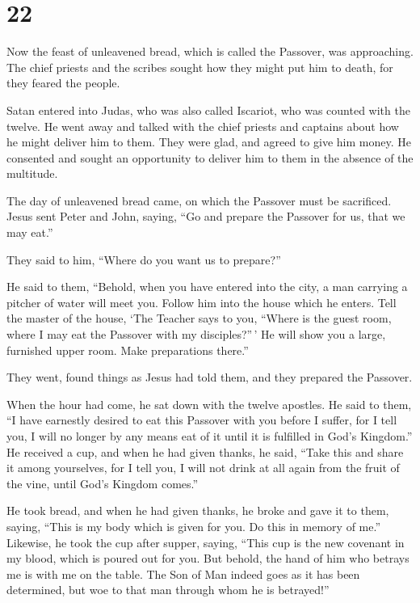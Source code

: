 \hypertarget{section-21}{%
\section{22}\label{section-21}}

 Now the feast of unleavened bread, which is called the
Passover, was approaching.  The chief priests and the
scribes sought how they might put him to death, for they feared the
people.

 Satan entered into Judas, who was also called Iscariot, who
was counted with the twelve.  He went away and talked with
the chief priests and captains about how he might deliver him to them.
 They were glad, and agreed to give him money. 
He consented and sought an opportunity to deliver him to them in the
absence of the multitude.

 The day of unleavened bread came, on which the Passover
must be sacrificed.  Jesus sent Peter and John, saying, ``Go
and prepare the Passover for us, that we may eat.''

 They said to him, ``Where do you want us to prepare?''

 He said to them, ``Behold, when you have entered into the
city, a man carrying a pitcher of water will meet you. Follow him into
the house which he enters.  Tell the master of the house,
`The Teacher says to you, ``Where is the guest room, where I may eat the
Passover with my disciples?''\,'  He will show you a large,
furnished upper room. Make preparations there.''

 They went, found things as Jesus had told them, and they
prepared the Passover.

 When the hour had come, he sat down with the twelve
apostles.  He said to them, ``I have earnestly desired to
eat this Passover with you before I suffer,  for I tell
you, I will no longer by any means eat of it until it is fulfilled in
God's Kingdom.''  He received a cup, and when he had given
thanks, he said, ``Take this and share it among yourselves,
 for I tell you, I will not drink at all again from the
fruit of the vine, until God's Kingdom comes.''

 He took bread, and when he had given thanks, he broke and
gave it to them, saying, ``This is my body which is given for you. Do
this in memory of me.''  Likewise, he took the cup after
supper, saying, ``This cup is the new covenant in my blood, which is
poured out for you.  But behold, the hand of him who
betrays me is with me on the table.  The Son of Man indeed
goes as it has been determined, but woe to that man through whom he is
betrayed!''

